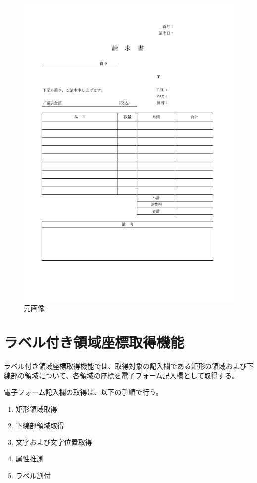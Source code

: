 \begin{figure}[t]
    \begin{center}
        \includegraphics[width=15cm]{image/03-function/original.jpg}
        \caption{元画像}
        \label{fig:original}
    \end{center}
\end{figure}


\section{ラベル付き領域座標取得機能}\label{sec:eform_write_space_obtainment_feature}
ラベル付き領域座標取得機能では、取得対象の記入欄である矩形の領域および下線部の領域について、各領域の座標を電子フォーム記入欄として取得する。

電子フォーム記入欄の取得は、以下の手順で行う。

\begin{enumerate}
    \item 矩形領域取得
    \item 下線部領域取得
    \item 文字および文字位置取得
    \item 属性推測
    \item ラベル割付
\end{enumerate}

